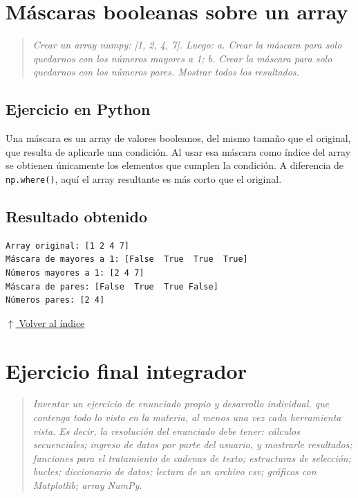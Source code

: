 \documentclass[12pt]{article}
\newcommand{\codigopython}[2]{%
}
\newcommand{\volverindice}{%
    \vspace{1em}%
    \begin{flushright}%
        \hyperlink{indice}{\small $\uparrow$ Volver al índice}%
    \end{flushright}%
}
\newcommand{\enunciado}[1]{%
    \begin{quote}
        \itshape #1
    \end{quote}
}
\begin{document}

\section{Máscaras booleanas sobre un array}

\enunciado{Crear un array numpy: [1, 2, 4, 7]. Luego: a. Crear la máscara para solo quedarnos con los números mayores a 1; b. Crear la máscara para solo quedarnos con los números pares. Mostrar todos los resultados.}

\subsection*{Ejercicio en Python}

Una máscara es un array de valores booleanos, del mismo tamaño que el original, que resulta de aplicarle una condición. Al usar esa máscara como índice del array se obtienen únicamente los elementos que cumplen la condición. A diferencia de \texttt{np.where()}, aquí el array resultante es más corto que el original.

\codigopython{13}{Máscaras booleanas sobre un array}

\subsection*{Resultado obtenido}

\begin{lstlisting}[style=salida]
Array original: [1 2 4 7]
Máscara de mayores a 1: [False  True  True  True]
Números mayores a 1: [2 4 7]
Máscara de pares: [False  True  True False]
Números pares: [2 4]
\end{lstlisting}

\volverindice


\newpage
{}
\section*{Ejercicio final integrador}

\enunciado{Inventar un ejercicio de enunciado propio y desarrollo individual, que contenga todo lo visto en la materia, al menos una vez cada herramienta vista. Es decir, la resolución del enunciado debe tener: cálculos secuenciales; ingreso de datos por parte del usuario, y mostrarle resultados; funciones para el tratamiento de cadenas de texto; estructuras de selección; bucles; diccionario de datos; lectura de un archivo csv; gráficos con Matplotlib; array NumPy.}
\end{document}
